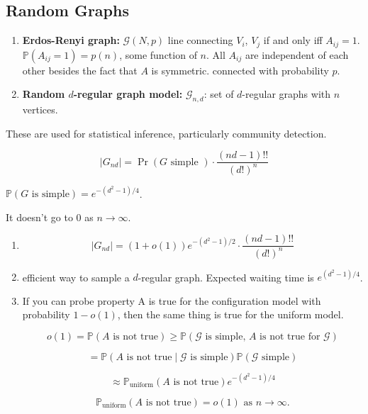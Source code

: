 \subsection{Random Graphs}

\begin{enumerate}

\item  \textbf{Erdos-Renyi graph:} \(\mathcal{G}(N, p)\) line connecting \(V_i\), \(V_j\) if and only iff \(A_{ij} = 1\). \(\mathbb{P}(A_{ij} = 1) = p(n)\), some function of \(n\). All \(A_{ij}\) are independent of each other besides the fact that \(A\) is symmetric. connected with probability \(p\).

\item \textbf{Random \(d\)-regular graph model:} \(\mathcal{G}_{n, d}\): set of \(d\)-regular graphs with \(n\) vertices.

\end{enumerate}

These are used for statistical inference, particularly community detection.

\[
| G_{nd}| = \Pr(G \text{ simple }) \cdot \frac{(nd-1)!!}{(d!)^n}
\]

\begin{theorem}



\(\mathbb{P}(G \text{ is simple}) = e^{-(d^2-1)/4}\).

\end{theorem}

\begin{remark}It doesn't go to 0 as \(n \to \infty\).

\begin{enumerate}

\item 

\[
|G_{nd}| = (1 + o(1)) e^{-(d^2-1)/2} \cdot \frac{(nd-1)!!}{(d!)^n}
\]

\item efficient way to sample a \(d\)-regular graph. Expected waiting time is \(e^{(d^2-1)/4}\).

\item If you can probe property A is true for the configuration model with probability \(1 - o(1)\), then the same thing is true for the uniform model.

\[
o(1) = \mathbb{P}(A \text{ is not true}) \geq \mathbb{P}(\mathcal{G} \text{ is simple, } A \text{ is not true for } \mathcal{G})
\]

\[
=  \mathbb{P}(A \text{ is not true} \mid \mathcal{G} \text{ is simple} ) \mathbb{P}(\mathcal{G} \text{ simple})
\]

\[
\approx \mathbb{P}_{\text{uniform}} (A \text{ is not true}) e^{-(d^2 - 1)/4} 
\]

\[
\mathbb{P}_{\text{uniform}} (A \text{ is not true}) = o(1) \text{ as } n \to \infty.
\]

\end{enumerate}

\end{remark}

%
%
%
%
%
%
%
%
%
%
%
%



